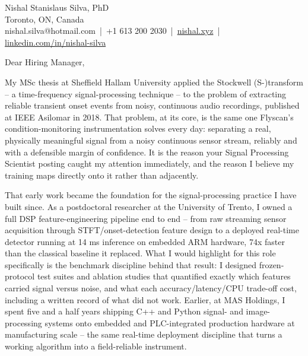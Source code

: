 \documentclass[11pt]{article}
\begin{document}
\pagestyle{empty}

\begin{flushleft}
Nishal Stanislaus Silva, PhD \\
Toronto, ON, Canada \\
nishal.silva@hotmail.com \,|\, +1 613 200 2030 \,|\, \href{https://nishal.xyz}{nishal.xyz} \,|\, \href{https://www.linkedin.com/in/nishal-silva}{linkedin.com/in/nishal-silva}
\end{flushleft}

\vspace{1em}

Dear Hiring Manager,

\vspace{0.5em}

My MSc thesis at Sheffield Hallam University applied the Stockwell (S-)transform -- a time-frequency signal-processing technique -- to the problem of extracting reliable transient onset events from noisy, continuous audio recordings, published at IEEE Asilomar in 2018. That problem, at its core, is the same one Flyscan's condition-monitoring instrumentation solves every day: separating a real, physically meaningful signal from a noisy continuous sensor stream, reliably and with a defensible margin of confidence. It is the reason your Signal Processing Scientist posting caught my attention immediately, and the reason I believe my training maps directly onto it rather than adjacently.

That early work became the foundation for the signal-processing practice I have built since. As a postdoctoral researcher at the University of Trento, I owned a full DSP feature-engineering pipeline end to end -- from raw streaming sensor acquisition through STFT/onset-detection feature design to a deployed real-time detector running at 14 ms inference on embedded ARM hardware, 74x faster than the classical baseline it replaced. What I would highlight for this role specifically is the benchmark discipline behind that result: I designed frozen-protocol test suites and ablation studies that quantified exactly which features carried signal versus noise, and what each accuracy/latency/CPU trade-off cost, including a written record of what did not work. Earlier, at MAS Holdings, I spent five and a half years shipping C++ and Python signal- and image-processing systems onto embedded and PLC-integrated production hardware at manufacturing scale -- the same real-time deployment discipline that turns a working algorithm into a field-reliable instrument.
\end{document}
